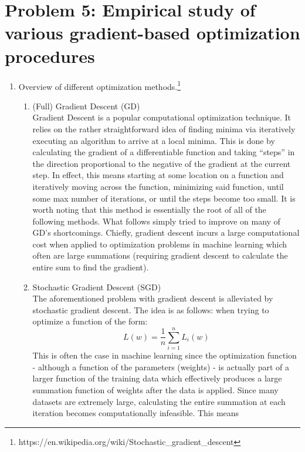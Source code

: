 \documentclass[twoside,11pt]{homework}
\DeclarePairedDelimiter{\2norm}{\lVert}{\rVert^2_2}
\newcommand{\1}[1]{\mathds{1}\left[#1\right]}
\begin{document}
\section*{Problem 5: Empirical study of various gradient-based optimization procedures}


\begin{enumerate}[\bf (i)]
  \item
    Overview of different optimization
    methods.\footnote{https://en.wikipedia.org/wiki/Stochastic\_gradient\_descent}
    \begin{enumerate}
      \item (Full) Gradient Descent (GD) \\
        Gradient Descent is a popular computational optimization technique. It
        relies on the rather straightforward idea of finding minima via
        iteratively executing an algorithm to arrive at a local minima. This is
        done by calculating the gradient of a differentiable function and taking
        ``steps'' in the direction proportional to the negative of the gradient
        at the current step. In effect, this means starting at some location on
        a function and iteratively moving across the function, minimizing said
        function, until some max number of iterations, or until the steps become
        too small. It is worth noting that this method is essentially the root
        of all of the following methods. What follows simply tried to improve on
        many of GD's shortcomings. Chiefly, gradient descent incurs a large
        computational cost when applied to optimization problems in machine
        learning which often are large summations (requiring gradient descent to
        calculate the entire sum to find the gradient).
      \item Stochastic Gradient Descent (SGD) \\
        The aforementioned problem with gradient descent is alleviated by
        stochastic gradient descent. The idea is as follows: when trying to
        optimize a function of the form:
        \[
        L(w) = \frac{1}{n}\sum_{i=1}^{n}L_{i}(w)
        \]
        This is often the case in machine learning since the optimization
        function - although a function of the parameters (weights) - is actually
        part of a larger function of the training data which effectively
        produces a large summation function of weights after the data is
        applied. Since many datasets are extremely large, calculating the entire
        summation at each iteration becomes computationally infeasible. This
        means
       

\end{enumerate}
\end{enumerate}
\end{document}
